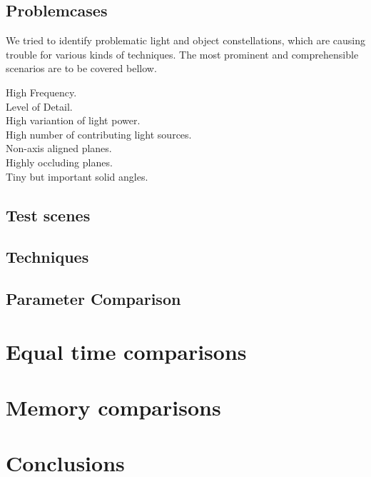 \subsection{Problemcases}

We tried to identify problematic light and object constellations, which are causing trouble for various kinds of techniques. The most prominent and comprehensible scenarios are to be covered bellow. 

\begin{description}
    \item[High Frequency.] 
    \item[Level of Detail.]
    \item[High variantion of light power.] 
    \item[High number of contributing light sources.]
    \item[Non-axis aligned planes.]
    \item[Highly occluding planes.]
    \item[Tiny but important solid angles.] 
\end{description} 

\subsection{Test scenes}


\subsection{Techniques}


\subsection{Parameter Comparison}




\label{ch:ev:photontree}


\label{ch:ev:cdftree}


\section{Equal time comparisons}

\section{Memory comparisons}

\section{Conclusions}
